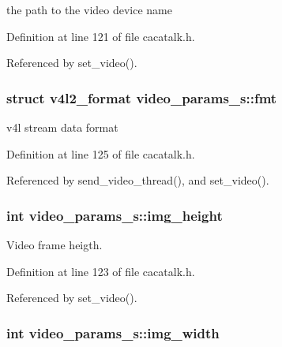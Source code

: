 the path to the video device name 



\-Definition at line 121 of file cacatalk.\-h.



\-Referenced by set\-\_\-video().

\hypertarget{structvideo__params__s_a10f56a8af702f24871d7dff8745380fe}{
\subsubsection[{fmt}]{\setlength{\rightskip}{0pt plus 5cm}struct v4l2\-\_\-format {\bf video\-\_\-params\-\_\-s\-::fmt}}}\label{structvideo__params__s_a10f56a8af702f24871d7dff8745380fe}


v4l stream data format 



\-Definition at line 125 of file cacatalk.\-h.



\-Referenced by send\-\_\-video\-\_\-thread(), and set\-\_\-video().

\hypertarget{structvideo__params__s_aff04696ffc57cb0ae2676fe9e3ffe354}{
\subsubsection[{img\-\_\-height}]{\setlength{\rightskip}{0pt plus 5cm}int {\bf video\-\_\-params\-\_\-s\-::img\-\_\-height}}}\label{structvideo__params__s_aff04696ffc57cb0ae2676fe9e3ffe354}


\-Video frame heigth. 



\-Definition at line 123 of file cacatalk.\-h.



\-Referenced by set\-\_\-video().

\hypertarget{structvideo__params__s_a8da7922c30e29e54fa97380d1c957a18}{
\subsubsection[{img\-\_\-width}]{\setlength{\rightskip}{0pt plus 5cm}int {\bf video\-\_\-params\-\_\-s\-::img\-\_\-width}}}\label{structvideo__params__s_a8da7922c30e29e54fa97380d1c957a18}


